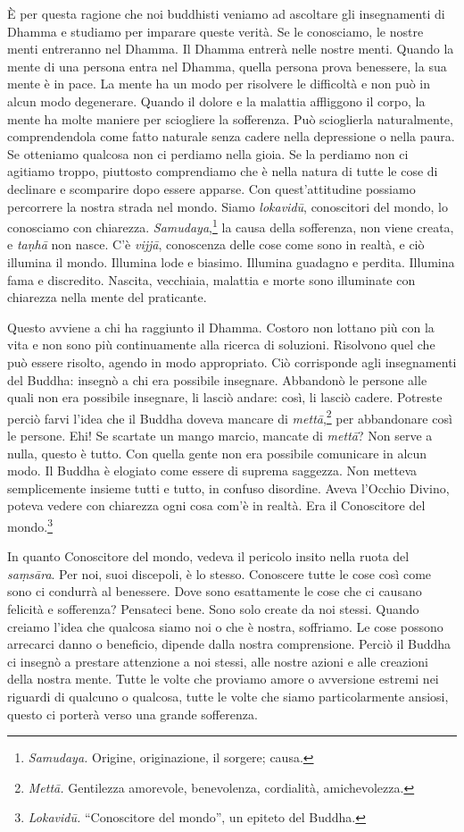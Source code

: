 È per questa ragione che noi buddhisti veniamo ad ascoltare gli
insegnamenti di Dhamma e studiamo per imparare queste verità. Se le
conosciamo, le nostre menti entreranno nel Dhamma. Il Dhamma entrerà
nelle nostre menti. Quando la mente di una persona entra nel Dhamma,
quella persona prova benessere, la sua mente è in pace. La mente ha un
modo per risolvere le difficoltà e non può in alcun modo degenerare.
Quando il dolore e la malattia affliggono il corpo, la mente ha molte
maniere per sciogliere la sofferenza. Può scioglierla naturalmente,
comprendendola come fatto naturale senza cadere nella depressione o
nella paura. Se otteniamo qualcosa non ci perdiamo nella gioia. Se la
perdiamo non ci agitiamo troppo, piuttosto comprendiamo che è nella
natura di tutte le cose di declinare e scomparire dopo essere apparse.
Con quest'attitudine possiamo percorrere la nostra strada nel mondo.
Siamo \emph{lokavidū}, conoscitori del mondo, lo conosciamo con
chiarezza. \emph{Samudaya},\footnote{%
  \emph{Samudaya.} Origine, originazione, il sorgere; causa.}
la causa della sofferenza, non viene
creata, e \emph{taṇhā} non nasce. C'è \emph{vijjā}, conoscenza delle
cose come sono in realtà, e ciò illumina il mondo. Illumina lode e
biasimo. Illumina guadagno e perdita. Illumina fama e discredito.
Nascita, vecchiaia, malattia e morte sono illuminate con chiarezza nella
mente del praticante.

Questo avviene a chi ha raggiunto il Dhamma. Costoro non lottano più con
la vita e non sono più continuamente alla ricerca di soluzioni.
Risolvono quel che può essere risolto, agendo in modo appropriato. Ciò
corrisponde agli insegnamenti del Buddha: insegnò a chi era possibile
insegnare. Abbandonò le persone alle quali non era possibile insegnare,
li lasciò andare: così, li lasciò cadere. Potreste perciò farvi l'idea
che il Buddha doveva mancare di \emph{mettā},\footnote{\emph{Mettā.}
  Gentilezza amorevole, benevolenza, cordialità, amichevolezza.} per
abbandonare così le persone. Ehi! Se scartate un mango marcio, mancate
di \emph{mettā}? Non serve a nulla, questo è tutto. Con quella gente non
era possibile comunicare in alcun modo. Il Buddha è elogiato come essere
di suprema saggezza. Non metteva semplicemente insieme tutti e tutto, in
confuso disordine. Aveva l'Occhio Divino, poteva vedere con chiarezza
ogni cosa com'è in realtà. Era il Conoscitore del mondo.\footnote{\emph{Lokavidū.}
  ``Conoscitore del mondo'', un epiteto del Buddha.}

In quanto Conoscitore del mondo, vedeva il pericolo insito nella ruota
del \emph{saṃsāra}. Per noi, suoi discepoli, è lo stesso. Conoscere
tutte le cose così come sono ci condurrà al benessere. Dove sono
esattamente le cose che ci causano felicità e sofferenza? Pensateci
bene. Sono solo create da noi stessi. Quando creiamo l'idea che qualcosa
siamo noi o che è nostra, soffriamo. Le cose possono arrecarci danno o
beneficio, dipende dalla nostra comprensione. Perciò il Buddha ci
insegnò a prestare attenzione a noi stessi, alle nostre azioni e alle
creazioni della nostra mente. Tutte le volte che proviamo amore o
avversione estremi nei riguardi di qualcuno o qualcosa, tutte le volte
che siamo particolarmente ansiosi, questo ci porterà verso una grande
sofferenza.

